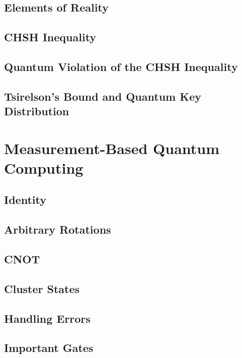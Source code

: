	\section{Elements of Reality} %

	\section{CHSH Inequality} %

	\section{Quantum Violation of the CHSH Inequality} %

	\section{Tsirelson's Bound and Quantum Key Distribution} %

\chapter{Measurement-Based Quantum Computing} %

	\section{Identity} %

	\section{Arbitrary Rotations} %

	\section{CNOT} %

	\section{Cluster States} %

	\section{Handling Errors} %

	\section{Important Gates} %
